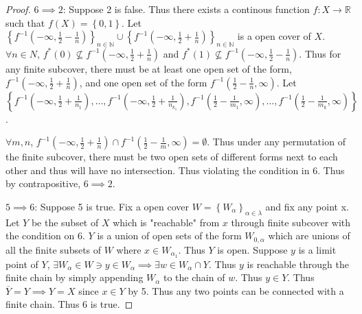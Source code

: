 \documentclass{article}
\newcommand*{\subeq}{\subseteq}
\newcommand*{\empset}{\emptyset}
\newcommand{\R}{\mathbb{R}}
\newcommand{\N}{\mathbb{N}}
\begin{document}
\begin{proof}
    $6 \implies 2$: Suppose 2 is false. Thus there exists a continous function $f: X \to \R$ such that $f(X) = \left\{ 0, 1 \right\}$. Let $\left\{ f^{-1}(-\infty, \frac{1}{2} - \frac{1}{n}) \right\}_{n \in \N} \cup \left\{ f^{-1}(-\infty, \frac{1}{2} + \frac{1}{n}) \right\}_{n \in \N}$ is a open cover of $X$. $\forall n \in N$, $f^*(0) \not \subeq f^{-1}(-\infty, \frac{1}{2} + \frac{1}{n})$ and $f^*(1) \not \subeq f^{-1}(-\infty, \frac{1}{2} - \frac{1}{n})$. Thus for any finite subcover, there must be at least one open set of the form, $f^{-1}(-\infty, \frac{1}{2} + \frac{1}{n})$, and one open set of the form $f^{-1}(\frac{1}{2} - \frac{1}{n}, \infty)$. Let $\left\{f^{-1}(-\infty, \frac{1}{2} + \frac{1}{n_{1}}), \dots, f^{-1}(-\infty, \frac{1}{2} + \frac{1}{n_{k_1}}),   f^{-1}(\frac{1}{2} - \frac{1}{m_1}, \infty), \dots, f^{-1}(\frac{1}{2} - \frac{1}{m_k}, \infty) \right\}$. 
    
    $\forall m, n$, $f^{-1}(-\infty, \frac{1}{2} + \frac{1}{n}) \cap f^{-1}(\frac{1}{2} - \frac{1}{m}, \infty) = \empset$. Thus under any permutation of the finite subcover, there must be two open sets of different forms next to each other and thus will have no intersection. Thus violating the condition in $6$. Thus by contrapositive, $6 \implies 2$. 
    
    $5 \implies 6$: Suppose 5 is true. Fix a open cover $W = \left\{ W_\alpha \right\}_{\alpha \in \lambda}$ and fix any point x. Let $Y$ be the subset of $X$ which is "reachable" from $x$ through finite subcover with the condition on $6$. $Y$ is a union of open sets of the form $W_{0, \alpha}$ which are unions of all the finite subsets of $W$ where $x \in W_{\alpha_1}$. Thus $Y$ is open. Suppose $y$ is a limit point of $Y$, $\exists W_\alpha \in W \ni y \in W_\alpha \implies \exists w \in W_\alpha \cap Y$. Thus $y$ is reachable through the finite chain by simply appending $W_\alpha$ to the chain of $w$. Thus $y \in Y$. Thus $\overline{Y} = Y \implies Y = X$ since $x \in Y$ by 5. Thus any two points can be connected with a finite chain. Thus $6$ is true.       
\end{proof}

\bigskip
\end{document}
